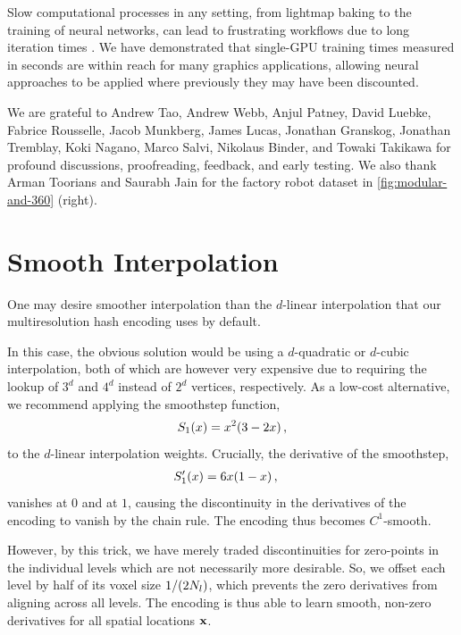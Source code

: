 \documentclass[acmtog,authorversion]{acmart}
\begin{document}
Slow computational processes in any setting, from lightmap baking to the training of neural networks, can lead to frustrating workflows due to long iteration times \cite{endertonworkflow}.
We have demonstrated that single-GPU training times measured in seconds are within reach for many graphics applications, allowing neural approaches to be applied where previously they may have been discounted.



\begin{acks}
We are grateful to
Andrew Tao,
Andrew Webb,
Anjul Patney,
David Luebke,
Fabrice Rousselle,
Jacob Munkberg,
James Lucas,
Jonathan Granskog,
Jonathan Tremblay,
Koki Nagano,
Marco Salvi,
Nikolaus Binder, and
Towaki Takikawa
for profound discussions, proofreading, feedback, and early testing.
We also thank Arman Toorians and Saurabh Jain for the factory robot dataset in \autoref{fig:modular-and-360} (right).
\end{acks}






\appendix

\section{Smooth Interpolation}\label{app:smooth-interpolation}

One may desire smoother interpolation than the $d$-linear interpolation that our multiresolution hash encoding uses by default.

In this case, the obvious solution would be using a $d$-quadratic or $d$-cubic interpolation, both of which are however very expensive due to requiring the lookup of $3^d$ and $4^d$ instead of $2^d$ vertices, respectively.
As a low-cost alternative, we recommend applying the smoothstep function,
\begin{align}
  S_1(x) = x^2(3 - 2x) \,,
\end{align}
to the $d$-linear interpolation weights.
Crucially, the derivative of the smoothstep,
\begin{align}
  S_1'(x) &= 6x(1-x) \,,
\end{align}
vanishes at $0$ and at $1$, causing the discontinuity in the derivatives of the encoding to vanish by the chain rule.
The encoding thus becomes $C^1$-smooth.

However, by this trick, we have merely traded discontinuities for zero-points in the individual levels which are not necessarily more desirable.
So, we offset each level by half of its voxel size $1/(2N_l)$, which prevents the zero derivatives from aligning across all levels.
The encoding is thus able to learn smooth, non-zero derivatives for all spatial locations $\mathbf{x}$.
\end{document}
